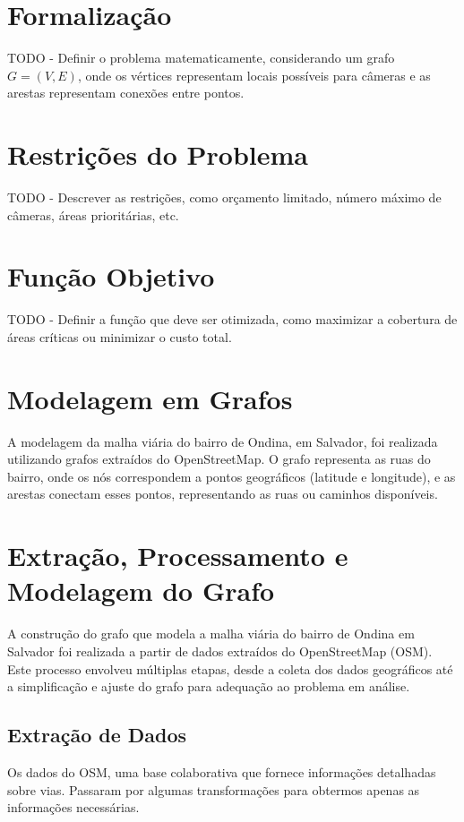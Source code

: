 \documentclass[12pt, a4paper]{report}
\begin{document}
\section{Formalização}
TODO - Definir o problema matematicamente, considerando um grafo \(G = (V, E)\), onde os vértices representam locais possíveis para câmeras e as arestas representam conexões entre pontos.

\section{Restrições do Problema}
TODO - Descrever as restrições, como orçamento limitado, número máximo de câmeras, áreas prioritárias, etc.

\section{Função Objetivo}
TODO - Definir a função que deve ser otimizada, como maximizar a cobertura de áreas críticas ou minimizar o custo total.

\section{Modelagem em Grafos}

A modelagem da malha viária do bairro de Ondina, em Salvador, foi realizada utilizando grafos extraídos do OpenStreetMap. O grafo representa as ruas do bairro, onde os nós correspondem a pontos geográficos (latitude e longitude), e as arestas conectam esses pontos, representando as ruas ou caminhos disponíveis.

\section{Extração, Processamento e Modelagem do Grafo}

A construção do grafo que modela a malha viária do bairro de Ondina em Salvador foi realizada a partir de dados extraídos do OpenStreetMap (OSM). Este processo envolveu múltiplas etapas, desde a coleta dos dados geográficos até a simplificação e ajuste do grafo para adequação ao problema em análise.

\subsection{Extração de Dados}

Os dados do OSM, uma base colaborativa que fornece informações detalhadas sobre vias. Passaram por algumas transformações para obtermos apenas as informações necessárias.
\end{document}
